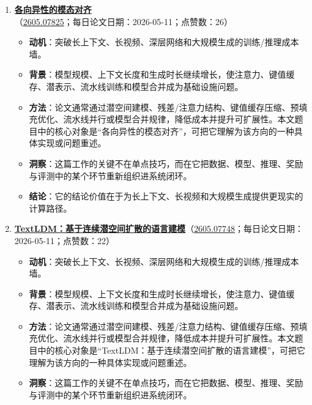 \begin{enumerate}[leftmargin=1.5em]
\begin{itemize}[leftmargin=1.5em]
    \item \textbf{洞察}：这篇工作的关键不在单点技巧，而在它把数据、模型、推理、奖励与评测中的某个环节重新组织进系统闭环。
    \item \textbf{结论}：它的结论价值在于为长上下文、长视频和大规模生成提供更现实的计算路径。
  \end{itemize}
  \item \textbf{\href{https://huggingface.co/papers/2605.07825}{各向异性的模态对齐}}（\href{https://arxiv.org/abs/2605.07825}{2605.07825}；每日论文日期：2026-05-11；点赞数：26）
  \begin{itemize}[leftmargin=1.5em]
    \item \textbf{动机}：突破长上下文、长视频、深层网络和大规模生成的训练/推理成本墙。
    \item \textbf{背景}：模型规模、上下文长度和生成时长继续增长，使注意力、键值缓存、潜表示、流水线训练和模型合并成为基础设施问题。
    \item \textbf{方法}：论文通常通过潜空间建模、残差/注意力结构、键值缓存压缩、预填充优化、流水线并行或模型合并规律，降低成本并提升可扩展性。本文题目中的核心对象是“各向异性的模态对齐”，可把它理解为该方向的一种具体实现或问题重述。
    \item \textbf{洞察}：这篇工作的关键不在单点技巧，而在它把数据、模型、推理、奖励与评测中的某个环节重新组织进系统闭环。
    \item \textbf{结论}：它的结论价值在于为长上下文、长视频和大规模生成提供更现实的计算路径。
  \end{itemize}
  \item \textbf{\href{https://huggingface.co/papers/2605.07748}{TextLDM：基于连续潜空间扩散的语言建模}}（\href{https://arxiv.org/abs/2605.07748}{2605.07748}；每日论文日期：2026-05-11；点赞数：22）
  \begin{itemize}[leftmargin=1.5em]
    \item \textbf{动机}：突破长上下文、长视频、深层网络和大规模生成的训练/推理成本墙。
    \item \textbf{背景}：模型规模、上下文长度和生成时长继续增长，使注意力、键值缓存、潜表示、流水线训练和模型合并成为基础设施问题。
    \item \textbf{方法}：论文通常通过潜空间建模、残差/注意力结构、键值缓存压缩、预填充优化、流水线并行或模型合并规律，降低成本并提升可扩展性。本文题目中的核心对象是“TextLDM：基于连续潜空间扩散的语言建模”，可把它理解为该方向的一种具体实现或问题重述。
    \item \textbf{洞察}：这篇工作的关键不在单点技巧，而在它把数据、模型、推理、奖励与评测中的某个环节重新组织进系统闭环。

\end{itemize}
\end{enumerate}

